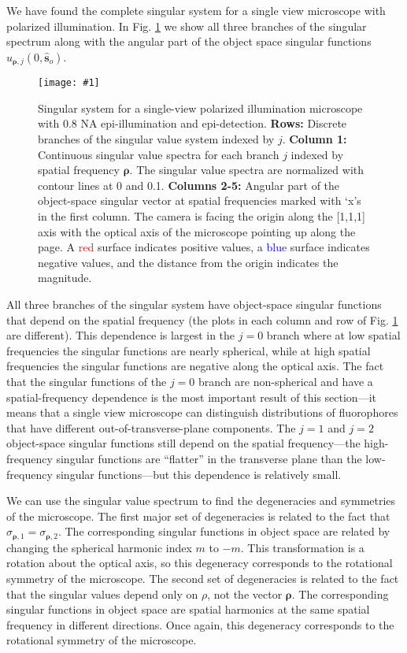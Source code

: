 \documentclass[11pt]{article}
\providecommand{\so}[1]{\mathbf{\hat{s}}_o}
\providecommand{\bs}[1]{\boldsymbol{#1}}
\providecommand{\fig}[4]{
\begin{figure}[h]
 \captionsetup{width=1.0\linewidth}
 \centering
 \texttt{[image: \#1]}
 \caption{#3}
 \label{fig:#4}
\end{figure}
}
\begin{document}
We have found the complete singular system for a single view microscope with
polarized illumination. In Fig. \ref{fig:illsvs} we show all three branches of
the singular spectrum along with the angular part of the object space singular
functions $u_{\bs{\rho},j}(0, \so{})$.

\fig{../calculations/out/SVSill.pdf}{1.0}{Singular system for a single-view
  polarized illumination microscope with 0.8 NA epi-illumination and
  epi-detection. \textbf{Rows:} Discrete branches of the singular value system
  indexed by $j$. \textbf{Column 1:} Continuous singular value spectra for each
  branch $j$ indexed by spatial frequency $\bs{\rho}$. The singular value
  spectra are normalized with contour lines at 0 and 0.1. \textbf{Columns 2-5:}
  Angular part of the object-space singular vector at spatial frequencies marked
  with `x's in the first column. The camera is facing the origin along the
  [1,1,1] axis with the optical axis of the microscope pointing up along the
  page. A \textcolor{red}{red} surface indicates positive values, a
  \textcolor{blue}{blue} surface indicates negative values, and the distance
  from the origin indicates the magnitude.}{illsvs}

All three branches of the singular system have object-space singular functions
that depend on the spatial frequency (the plots in each column and row of Fig.
\ref{fig:illsvs} are different). This dependence is largest in the $j=0$ branch
where at low spatial frequencies the singular functions are nearly spherical,
while at high spatial frequencies the singular functions are negative along the
optical axis. The fact that the singular functions of the $j=0$ branch are
non-spherical and have a spatial-frequency dependence is the most important
result of this section---it means that a single view microscope can distinguish
distributions of fluorophores that have different out-of-transverse-plane
components. The $j=1$ and $j=2$ object-space singular functions still depend on
the spatial frequency---the high-frequency singular functions are ``flatter'' in
the transverse plane than the low-frequency singular functions---but this
dependence is relatively small.

We can use the singular value spectrum to find the degeneracies and symmetries
of the microscope. The first major set of degeneracies is related to the fact
that $\sigma_{\bs{\rho},1} = \sigma_{\bs{\rho},2}$. The corresponding singular
functions in object space are related by changing the spherical harmonic index
$m$ to $-m$. This transformation is a rotation about the optical axis, so this
degeneracy corresponds to the rotational symmetry of the microscope. The second
set of degeneracies is related to the fact that the singular values depend only
on $\rho$, not the vector $\bs{\rho}$. The corresponding singular functions in
object space are spatial harmonics at the same spatial frequency in different
directions. Once again, this degeneracy corresponds to the rotational symmetry
of the microscope.
\end{document}
